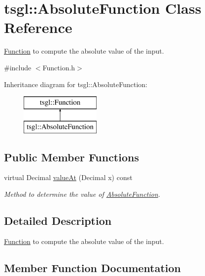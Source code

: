 \hypertarget{classtsgl_1_1_absolute_function}{}\section{tsgl\+:\+:Absolute\+Function Class Reference}
\label{classtsgl_1_1_absolute_function}


\hyperlink{classtsgl_1_1_function}{Function} to compute the absolute value of the input.  




{\ttfamily \#include $<$Function.\+h$>$}

Inheritance diagram for tsgl\+:\+:Absolute\+Function\+:\begin{figure}[H]
\begin{center}
\leavevmode
\includegraphics[height=2.000000cm]{classtsgl_1_1_absolute_function}
\end{center}
\end{figure}
\subsection*{Public Member Functions}
\begin{DoxyCompactItemize}
\item 
virtual Decimal \hyperlink{classtsgl_1_1_absolute_function_a57c7114b54ebfc4a35da1b5e9374e495}{value\+At} (Decimal x) const
\begin{DoxyCompactList}\small\item\em Method to determine the value of \hyperlink{classtsgl_1_1_absolute_function}{Absolute\+Function}. \end{DoxyCompactList}\end{DoxyCompactItemize}


\subsection{Detailed Description}
\hyperlink{classtsgl_1_1_function}{Function} to compute the absolute value of the input. 

\subsection{Member Function Documentation}
\mbox{\label{classtsgl_1_1_absolute_function_a57c7114b54ebfc4a35da1b5e9374e495}} 
